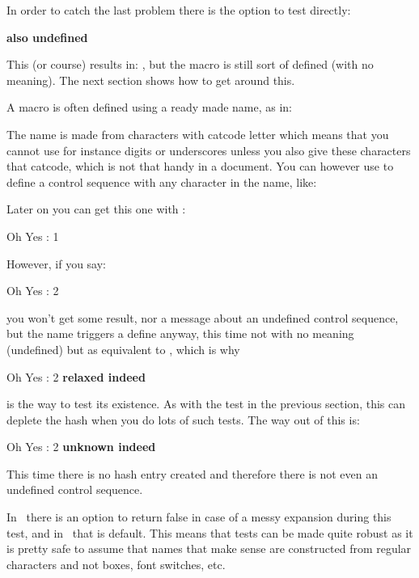 In order to catch the last problem there is the option to test directly:

\startbuffer
\ifdefined\MyOtherMacro \else
    {\bf also undefined}
\fi
\stopbuffer

\typebuffer[option=TEX]

This (or course) results in: \inlinebuffer, but the macro is still sort of
defined (with no meaning). The next section shows how to get around this.

\stopsectionlevel

\startsectionlevel[title={\tex{ifcsname}}]

A macro is often defined using a ready made name, as in:

\starttyping[option=TEX]
\stoptyping

The name is made from characters with catcode letter which means that you cannot
use for instance digits or underscores unless you also give these characters that
catcode, which is not that handy in a document. You can however use \type
{\csname} to define a control sequence with any character in the name, like:

\starttyping[option=TEX]
\expandafter{}
\stoptyping

Later on you can get this one with \type {\csname}:

\starttyping[option=TEX]
\csname Oh Yes : 1\endcsname
\stoptyping

However, if you say:

\starttyping[option=TEX]
\csname Oh Yes : 2\endcsname
\stoptyping

you won't get some result, nor a message about an undefined control sequence, but
the name triggers a define anyway, this time not with no meaning (undefined) but
as equivalent to \type {\relax}, which is why

\starttyping[option=TEX]
\expandafter\ifx\csname Oh Yes : 2\endcsname\relax
    {\bf relaxed indeed}
\fi
\stoptyping

is the way to test its existence. As with the test in the previous section,
this can deplete the hash when you do lots of such tests. The way out of this
is:

\starttyping[option=TEX]
\ifcsname Oh Yes : 2\endcsname \else
    {\bf unknown indeed}
\fi
\stoptyping

This time there is no hash entry created and therefore there is not even an
undefined control sequence.

In \LUATEX\ there is an option to return false in case of a messy expansion
during this test, and in \LUAMETATEX\ that is default. This means that tests can
be made quite robust as it is pretty safe to assume that names that make sense
are constructed from regular characters and not boxes, font switches, etc.

